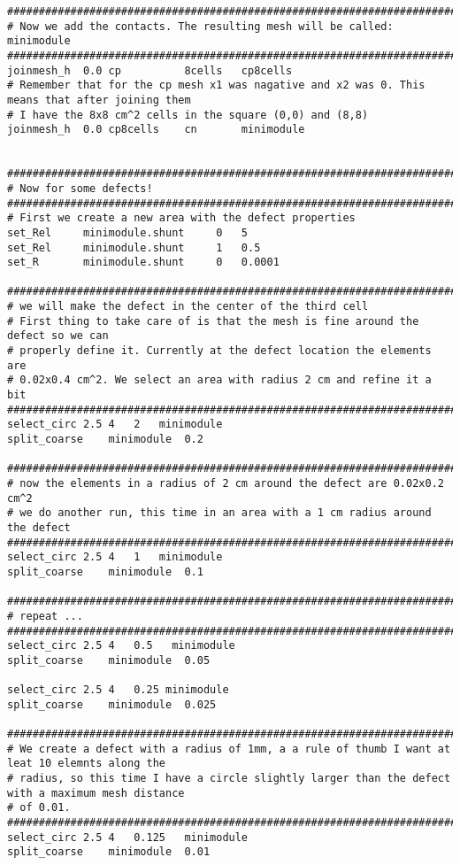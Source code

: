 \documentclass[noshowpacs,preprintnumbers,amsmath,amssymb, letter]{revtex4}
\begin{document}
\begin{small}
\begin{verbatim}
###################################################################################################
# Now we add the contacts. The resulting mesh will be called: minimodule
###################################################################################################
joinmesh_h  0.0 cp          8cells   cp8cells
# Remember that for the cp mesh x1 was nagative and x2 was 0. This means that after joining them
# I have the 8x8 cm^2 cells in the square (0,0) and (8,8) 
joinmesh_h  0.0 cp8cells    cn       minimodule


###################################################################################################
# Now for some defects!
###################################################################################################
# First we create a new area with the defect properties
set_Rel     minimodule.shunt     0   5
set_Rel     minimodule.shunt     1   0.5
set_R       minimodule.shunt     0   0.0001

###################################################################################################
# we will make the defect in the center of the third cell
# First thing to take care of is that the mesh is fine around the defect so we can 
# properly define it. Currently at the defect location the elements are 
# 0.02x0.4 cm^2. We select an area with radius 2 cm and refine it a bit
###################################################################################################
select_circ 2.5 4   2   minimodule
split_coarse    minimodule  0.2

###################################################################################################
# now the elements in a radius of 2 cm around the defect are 0.02x0.2 cm^2
# we do another run, this time in an area with a 1 cm radius around the defect 
###################################################################################################
select_circ 2.5 4   1   minimodule
split_coarse    minimodule  0.1

###################################################################################################
# repeat ...
###################################################################################################
select_circ 2.5 4   0.5   minimodule
split_coarse    minimodule  0.05

select_circ 2.5 4   0.25 minimodule
split_coarse    minimodule  0.025

###################################################################################################
# We create a defect with a radius of 1mm, a a rule of thumb I want at leat 10 elemnts along the 
# radius, so this time I have a circle slightly larger than the defect with a maximum mesh distance 
# of 0.01.
###################################################################################################
select_circ 2.5 4   0.125   minimodule
split_coarse    minimodule  0.01


\end{verbatim}
\end{small}
\end{document}
